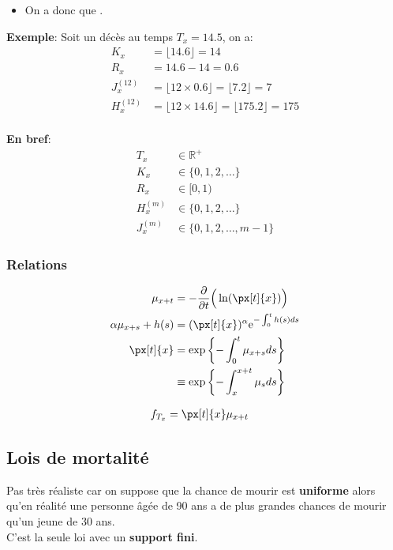 \documentclass[10pt, french]{article}
\begin{document}
\begin{multicols*}{3}
\begin{definitionNOHFILLsub}
\begin{itemize}[leftmargin = *]
	\item	On a donc que .
\end{itemize}
\end{definitionNOHFILLsub}

\textbf{Exemple}:	Soit un décès au temps $T_{x} = 14.5$, on a:
\begin{align*}
	K_{x}	
	&=	\lfloor	14.6	\rfloor	
	=	14	\\
	R_{x}
	&=	14.6 - 14
	=	0.6	\\
	J^{(12)}_{x}
	&=	\lfloor	12 \times 0.6	\rfloor	
	=	\lfloor	7.2	\rfloor	
	=	7	\\
	H^{(12)}_{x}
	&=	\lfloor	12 \times 14.6	\rfloor	
	=	\lfloor	175.2	\rfloor	
	=	175		\\
\end{align*}

\textbf{En bref}:
\begin{align*}
	T_{x} 
	&\in	\mathbb{R}^{+}	\\
	K_{x} 
	&\in	\{0, 1, 2, \dots\}	\\
	R_{x} 
	&\in	[0, 1)	\\
	H^{(m)}_{x} 
	&\in	\{0, 1, 2, \dots\}	\\
	J^{(m)}_{x} 
	&\in	\{0, 1, 2, \dots, m - 1\}
\end{align*}

\subsubsection*{Relations}
\begin{align*}
	\mu_{x+t} 
	&=	- \derivee{t} \Big( \ln(\px[t]{x}) \Big)	\\
	\alpha \mu_{x + s} + h(s) 
	&=	(\px[t]{x})^{\alpha} \textrm{e}^{-\int_{0}^{t} h(s)ds}	\\
	\px[t]{x}
	&=	\exp\left\{ -\int_{0}^{t} \mu_{x + s} ds \right\} 	\\
	&\equiv	\exp\left\{ -\int_{x}^{x + t} \mu_{s} ds \right\}
\end{align*}

\begin{align*}
	f_{T_{x}} 
	&=	\px[t]{x} \mu_{x + t}	
\end{align*}


\columnbreak

\subsection{Lois de mortalité}
\begin{rappel_enhanced}
Pas très réaliste car on suppose que la chance de mourir est \textbf{uniforme} alors qu'en réalité une personne âgée de 90 ans a de plus grandes chances de mourir qu'un jeune de 30 ans.	\\
C'est la seule loi avec un \textbf{support fini}. 


\end{rappel_enhanced}
\end{multicols*}
\end{document}
